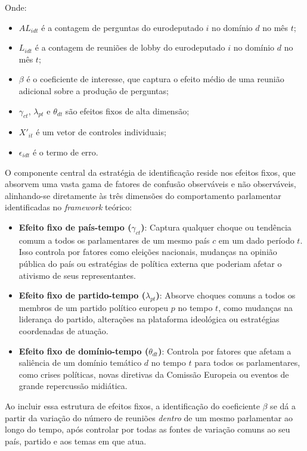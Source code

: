 Onde:
\begin{itemize}
    \item $AL_{idt}$ é a contagem de perguntas do eurodeputado $i$ no domínio $d$ no mês $t$;
    \item $L_{idt}$ é a contagem de reuniões de lobby do eurodeputado $i$ no domínio $d$ no mês $t$;
    \item $\beta$ é o coeficiente de interesse, que captura o efeito médio de uma reunião adicional sobre a produção de perguntas;
    \item $\gamma_{ct}$, $\lambda_{pt}$ e $\theta_{dt}$ são efeitos fixos de alta dimensão;
    \item $X'_{it}$ é um vetor de controles individuais;
    \item $\epsilon_{idt}$ é o termo de erro.
\end{itemize}

O componente central da estratégia de identificação reside nos efeitos fixos, que absorvem uma vasta gama de fatores de confusão observáveis e não observáveis, alinhando-se diretamente às três dimensões do comportamento parlamentar identificadas no \textit{framework} teórico:
\begin{itemize}
    \item \textbf{Efeito fixo de país-tempo ($\gamma_{ct}$)}: Captura qualquer choque ou tendência comum a todos os parlamentares de um mesmo país $c$ em um dado período $t$. Isso controla por fatores como eleições nacionais, mudanças na opinião pública do país ou estratégias de política externa que poderiam afetar o ativismo de seus representantes.
    \item \textbf{Efeito fixo de partido-tempo ($\lambda_{pt}$)}: Absorve choques comuns a todos os membros de um partido político europeu $p$ no tempo $t$, como mudanças na liderança do partido, alterações na plataforma ideológica ou estratégias coordenadas de atuação.
    \item \textbf{Efeito fixo de domínio-tempo ($\theta_{dt}$)}: Controla por fatores que afetam a saliência de um domínio temático $d$ no tempo $t$ para todos os parlamentares, como crises políticas, novas diretivas da Comissão Europeia ou eventos de grande repercussão midiática.
\end{itemize}

Ao incluir essa estrutura de efeitos fixos, a identificação do coeficiente $\beta$ se dá a partir da variação do número de reuniões \textit{dentro} de um mesmo parlamentar ao longo do tempo, após controlar por todas as fontes de variação comuns ao seu país, partido e aos temas em que atua.

